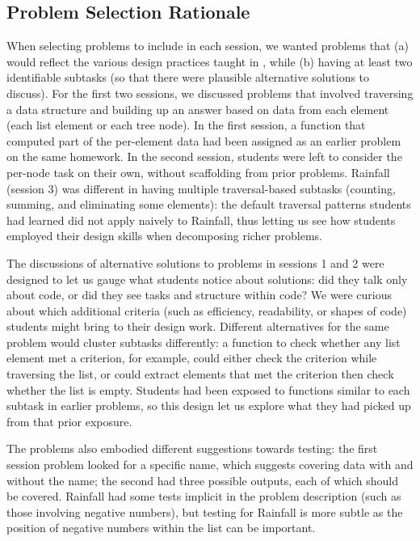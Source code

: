 \subsection{Problem Selection Rationale}

When selecting problems to include in each session, we wanted problems
that (a) would reflect the various design practices taught in \htdp,
while (b) having at least two identifiable subtasks (so that there
were plausible alternative solutions to discuss).  For the first two
sessions, we discussed problems that involved traversing a data
structure and building up an answer based on data from each element
(each list element or each tree node). In the
first session, a function that computed part of the per-element data
had been assigned as an earlier problem on the same homework.  In the
second session, students were left to consider the per-node task on
their own, without scaffolding from prior problems.  Rainfall \cite{soloway-learning86} (session
3) was different in having multiple traversal-based subtasks (counting, summing, and eliminating some elements): the
default traversal patterns students had learned did not apply naively
to Rainfall, thus letting us see how students employed
their design skills when decomposing richer problems.

The discussions of alternative solutions to problems in sessions 1 and
2 were designed to let us gauge what students notice about solutions:
did they talk only about code, or did they see tasks and structure
within code?  We were curious about which additional criteria (such as
efficiency, readability, or shapes of code) students might bring to
their design work.  Different alternatives for the same problem would
cluster subtasks differently: a function to check whether any list
element met a criterion, for example, could either check the criterion
while traversing the list, or could extract elements that met the
criterion then check whether the list is empty.  Students had been
exposed to functions similar to each subtask in earlier problems, so
this design let us explore what they had picked up from that prior
exposure.

The problems also embodied different suggestions towards testing: the first
session problem looked for a specific name, which suggests
covering data with and without the name; the second had three possible
outputs, each of which should be covered.  Rainfall had some
tests implicit in the problem description (such as those involving
negative numbers), but testing for Rainfall is more subtle as the
position of negative numbers within the list can be important.


